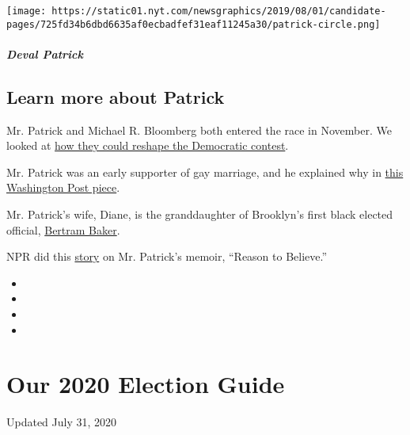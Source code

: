 \texttt{[image: https://static01.nyt.com/newsgraphics/2019/08/01/candidate-pages/725fd34b6dbd6635af0ecbadfef31eaf11245a30/patrick-circle.png]}

\hypertarget{deval-patrick-1}{%
\subparagraph{Deval Patrick}\label{deval-patrick-1}}

\hypertarget{learn-more-about-patrick}{%
\subsection{Learn more about Patrick}\label{learn-more-about-patrick}}

Mr. Patrick and Michael R. Bloomberg both entered the race in November.
We looked at
\href{https://www.nytimes.com/2019/11/15/us/politics/deval-patrick-michael-bloomberg-2020.html}{how
they could reshape the Democratic contest}.

Mr. Patrick was an early supporter of gay marriage, and he explained why
in
\href{https://www.washingtonpost.com/opinions/deval-patrick-gay-marriage-and-the-right-to-be-ordinary/2013/05/16/f84633cc-bd88-11e2-97d4-a479289a31f9_story.html}{this
Washington Post piece}.

Mr. Patrick's wife, Diane, is the granddaughter of Brooklyn's first
black elected official,
\href{https://www.nytimes.com/2018/11/02/nyregion/how-alexander-hamilton-inspired-bertram-baker-brooklyns-first-black-elected-official.html}{Bertram
Baker}.

NPR did this
\href{https://www.npr.org/2011/04/12/135242435/lessons-from-deval-patrick-a-not-likely-story}{story}
on Mr. Patrick's memoir, ``Reason to Believe.''

\begin{itemize}
\item
\item
\item
\item
\end{itemize}

\hypertarget{our-2020-election-guide}{%
\section{Our 2020 Election Guide}\label{our-2020-election-guide}}

Updated July 31, 2020

